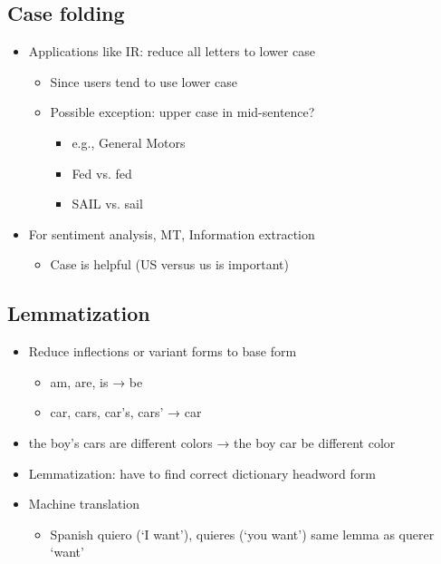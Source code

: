 \documentclass[11pt]{article}
\theoremstyle{definition}
\begin{document}
\subsection{Case folding}
\begin{itemize}
  \item Applications like IR: reduce all letters to lower case
  \begin{itemize}
    \item Since users tend to use lower case
    \item Possible exception: upper case in mid-sentence?
    \begin{itemize}
      \item e.g., General Motors
      \item Fed vs. fed
      \item SAIL vs. sail
    \end{itemize}
  \end{itemize}
  \item For sentiment analysis, MT, Information extraction
  \begin{itemize}
    \item Case is helpful (US versus us is important)
  \end{itemize}
\end{itemize}

\subsection{Lemmatization}
\begin{itemize}
  \item Reduce inflections or variant forms to base form
  \begin{itemize}
    \item am, are, is → be
    \item car, cars, car's, cars' → car
  \end{itemize}
  \item the boy's cars are different colors → the boy car be different color
  \item Lemmatization: have to find correct dictionary headword form
  \item Machine translation
  \begin{itemize}
    \item Spanish quiero (‘I want’), quieres (‘you want’) same lemma as querer ‘want’
  \end{itemize}
\end{itemize}
\end{document}
